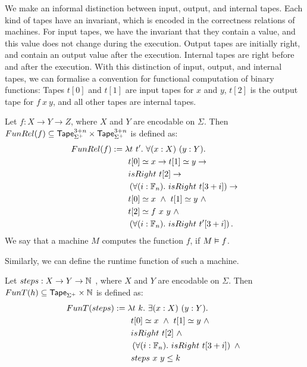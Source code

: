 We make an informal distinction between input, output, and internal tapes.  Each kind of tapes have an invariant, which is encoded in the correctness
relations of machines.  For input tapes, we have the invariant that they contain a value, and this value does not change during the execution.  Output
tapes are initially right, and contain an output value after the execution.  Internal tapes are right before and after the execution.  With this
distinction of input, output, and internal tapes, we can formalise a convention for functional computation of binary functions: Tapes $t[0]$ and
$t[1]$ are input tapes for $x$ and $y$, $t[2]$ is the output tape for $f~x~y$, and all other tapes are internal tapes.
\begin{definition}
  \label{def:Computes2_Rel}
  Let $f : X \to Y \to Z$, where $X$ and $Y$ are encodable on $\Sigma$.  Then
  $FunRel(f) \subseteq \mathsf{Tape}_{\Sigma^+}^{3+n} \times \mathsf{Tape}_{\Sigma^+}^{3+n}$ is defined as:
  \begin{alignat*}{2}
     FunRel(f) &:= \lambda t~t'.~\forall (x:X)~(y:Y). \\
    &\qquad t[0] \simeq x \rightarrow t[1] \simeq y \rightarrow \\
    &\qquad isRight~t[2] \rightarrow \\
    &\qquad \left(\forall (i:\mathbb{F}_n).~isRight~t[3+i] \right) \rightarrow \\
    &\qquad t[0] \simeq x ~\land~ t[1] \simeq y ~\land~ \\
    &\qquad t[2] \simeq f~x~y ~\land~ \\
    &\qquad \left(\forall (i:\mathbb{F}_n).~isRight~t'[3+i] \right).
  \end{alignat*}
  We say that a machine $M$ computes the function $f$, if $M \mathrel{\vDash} f$.
\end{definition}

Similarly, we can define the runtime function of such a machine.
\begin{definition}
  \label{def:Computes2_T}
  Let $steps : X \rightarrow Y \rightarrow \mathbb{N}$ , where $X$ and $Y$ are encodable on $\Sigma$.  Then $FunT(h) \subseteq \mathsf{Tape}_{\Sigma^+} \times \mathbb{N}$ is defined as:
  \begin{alignat*}{2}
     FunT(steps) &:= \lambda t~k.~\exists (x:X)~(y:Y). \\
    &\qquad t[0] \simeq x ~\land~ t[1] \simeq y ~\land~ \\
    &\qquad isRight~t[2] ~\land~ \\
    &\qquad \left(\forall (i:\mathbb{F}_n).~isRight~t[3+i] \right) ~\land~ \\
    &\qquad steps~x~y \leq k
  \end{alignat*}
\end{definition}

